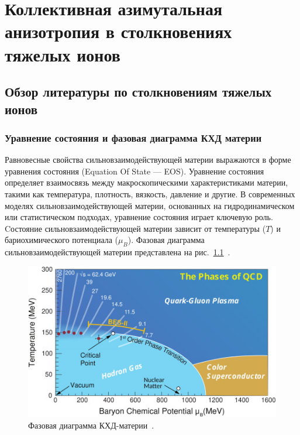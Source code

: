 \chapter{Коллективная азимутальная анизотропия в столкновениях тяжелых ионов} \label{chapt1}

\section{Обзор литературы по столкновениям тяжелых ионов}

\subsection{Уравнение состояния и фазовая диаграмма КХД материи}

Равновесные свойства сильновзаимодействующей материи выражаются в форме уравнения состояния (Equation Of State — EOS). 
Уравнение состояния определяет взаимосвязь между макроскопическими характеристиками материи, такими как температура, плотность, вязкость, давление и другие.
В современных моделях сильновзаимодействующей материи, основанных на гидродинамическом или статистическом подходах, уравнение состояния играет ключевую роль.
Cостояние сильновзаимодействующей материи зависит от температуры ($T$) и бариохимического потенциала ($\mu_B$).
Фазовая диаграмма сильновзаимодействующей материи представлена на рис.~\ref{fig:qcd_phase_diagram}~\cite{Bzdak:2019pkr}.
%
\begin{figure}[h]
    \centering
    \includegraphics[width=0.5\linewidth]{images/1-s2.0-S0370157320300156-gr1.jpg}
    \caption{Фазовая диаграмма КХД-материи~\cite{Bzdak:2019pkr}.}
    \label{fig:qcd_phase_diagram}
\end{figure}

